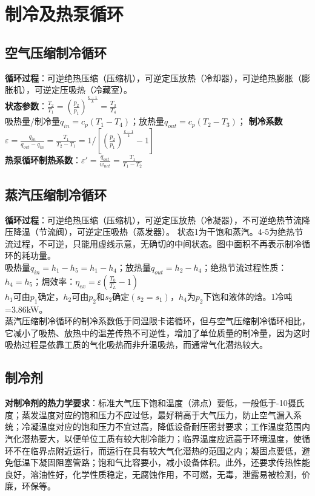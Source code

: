 \documentclass[a4paper,9pt]{ctexart}
\begin{document}
\section{制冷及热泵循环}


\subsection{空气压缩制冷循环}
\noindent
\textbf{循环过程}：可逆绝热压缩（压缩机），可逆定压放热（冷却器），可逆绝热膨胀（膨胀机），可逆定压吸热（冷藏室）。\\
\textbf{状态参数}：$\frac{T_2}{T_1}=\left(\frac{p_2}{p_1}\right)^\frac{k-1}{k}=\frac{T_3}{T_4}$\\
吸热量/制冷量$q_{in}=c_p(T_1-T_4)$；放热量$q_{out}=c_p(T_2-T_3)$；
\textbf{制冷系数}$\varepsilon=\frac{q_{in}}{q_{out}-q_{in}}=\frac{T_1}{T_2-T_1}
=1/\left[\left(\frac{p_2}{p_1}\right)^\frac{k-1}{k}-1\right]$\\
\textbf{热泵循环制热系数}：$\varepsilon'=\frac{q_{out}}{w_{net}}=\frac{T_1}{T_1-T_2}$


\subsection{蒸汽压缩制冷循环}
\noindent
\textbf{循环过程}：可逆绝热压缩（压缩机），可逆定压放热（冷凝器），不可逆绝热节流降压降温（节流阀），可逆定压吸热（蒸发器）。
状态1为干饱和蒸汽。4-5为绝热节流过程，不可逆，只能用虚线示意，无确切的中间状态。图中面积不再表示制冷循环的耗功量。\\
吸热量$q_{in}=h_1-h_5=h_1-h_4$；放热量$q_{out}=h_2-h_4$；绝热节流过程性质：$h_4=h_5$；㶲效率：$\eta_{ex}=\varepsilon\left(\frac{T_0}{T_L}-1\right)$\\
$h_1$可由$p_1$确定，$h_2$可由$p_2$和$s_2$确定$(s_2=s_1)$，$h_4$为$p_2$下饱和液体的焓。1冷吨=3.86kW。\\
蒸汽压缩制冷循环的制冷系数低于同温限卡诺循环，但与空气压缩制冷循环相比，它减小了吸热、放热中的温差传热不可逆性，增加了单位质量的制冷量，因为这时吸热过程是依靠工质的气化吸热而非升温吸热，而通常气化潜热较大。

\subsection{制冷剂}
\noindent
\textbf{对制冷剂的热力学要求}：标准大气压下饱和温度（沸点）要低，一般低于-10摄氏度；蒸发温度对应的饱和压力不应过低，最好稍高于大气压力，防止空气漏入系统；冷凝温度对应的饱和压力不宜过高，降低设备耐压密封要求；工作温度范围内汽化潜热要大，以便单位工质有较大制冷能力；临界温度应远高于环境温度，使循环不在临界点附近运行，而运行在具有较大气化潜热的范围之内；凝固点要低，避免低温下凝固阻塞管路；饱和气比容要小，减小设备体积。此外，还要求传热性能良好，溶油性好，化学性质稳定，无腐蚀作用，不可燃，无毒，泄露易被检测，价廉，环保等。
\end{document}
